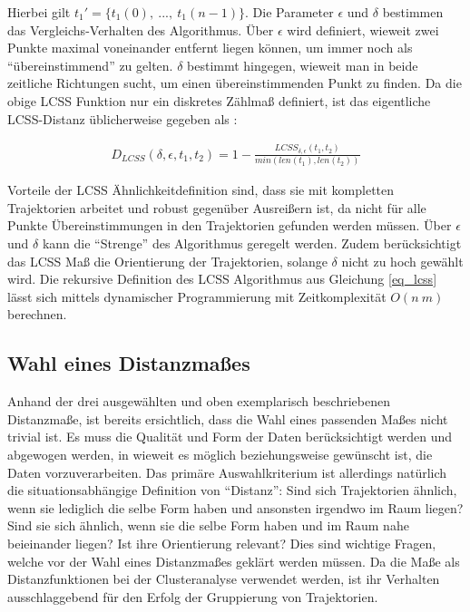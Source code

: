 Hierbei gilt $t_1' = \{ t_1(0),\ ...,\ t_1(n-1)\}$. Die Parameter $\epsilon$ und $\delta$ bestimmen das
Vergleichs-Verhalten des Algorithmus. Über $\epsilon$ wird definiert, wieweit zwei Punkte maximal voneinander entfernt liegen
können, um immer noch als ``übereinstimmend'' zu gelten. $\delta$ bestimmt hingegen, wieweit man in beide zeitliche Richtungen
sucht, um einen übereinstimmenden Punkt zu finden.
Da die obige LCSS Funktion nur ein diskretes Zählmaß definiert, ist das eigentliche LCSS-Distanz üblicherweise
gegeben als \cite[]{Vlachos2002}:

\begin{ceqn}
\begin{align}
\label{eq_lcss_distance}
    D_{LCSS}(\delta, \epsilon, t_1, t_2) = 1 - \frac{LCSS_{\delta, \epsilon}(t_1, t_2)}{min(len(t_1), len(t_2))}
\end{align}
\end{ceqn}


Vorteile der LCSS Ähnlichkeitdefinition sind, dass sie mit kompletten Trajektorien arbeitet und robust
gegenüber Ausreißern ist, da nicht für alle Punkte Übereinstimmungen in den Trajektorien gefunden werden müssen.
Über $\epsilon$ und $\delta$ kann die ``Strenge'' des Algorithmus geregelt werden.
Zudem berücksichtigt das LCSS Maß die Orientierung der Trajektorien, solange $\delta$ nicht zu hoch gewählt wird.
Die rekursive Definition des LCSS Algorithmus aus Gleichung \ref{eq_lcss} lässt sich mittels dynamischer Programmierung
mit Zeitkomplexität $O(n\ m)$ berechnen.

\subsection{Wahl eines Distanzmaßes}

Anhand der drei ausgewählten und oben exemplarisch beschriebenen Distanzmaße, ist bereits ersichtlich,
dass die Wahl eines passenden Maßes nicht trivial ist. Es muss die Qualität und Form der Daten berücksichtigt werden
und abgewogen werden, in wieweit es möglich beziehungsweise gewünscht ist, die Daten vorzuverarbeiten.
Das primäre Auswahlkriterium ist allerdings natürlich die situationsabhängige Definition von ``Distanz'':
Sind sich Trajektorien ähnlich, wenn sie lediglich die selbe Form haben und ansonsten irgendwo im Raum liegen? Sind sie
sich ähnlich, wenn sie die selbe Form haben und im Raum nahe beieinander liegen? Ist ihre Orientierung relevant?
Dies sind wichtige Fragen, welche vor der Wahl eines Distanzmaßes geklärt werden müssen.
Da die Maße als Distanzfunktionen bei der Clusteranalyse verwendet werden, ist ihr Verhalten ausschlaggebend
für den Erfolg der Gruppierung von Trajektorien.

